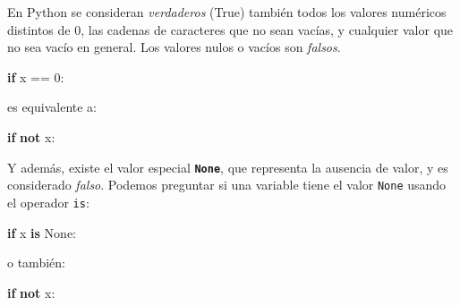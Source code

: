 \documentclass[
  letterpaper,
  DIV=11,
  numbers=noendperiod]{scrreprt}
\newenvironment{Shaded}{\begin{snugshade}}{\end{snugshade}}
\newcommand{\ControlFlowTok}[1]{\textcolor[rgb]{0.00,0.23,0.31}{\textbf{#1}}}
\newcommand{\DecValTok}[1]{\textcolor[rgb]{0.68,0.00,0.00}{#1}}
\newcommand{\KeywordTok}[1]{\textcolor[rgb]{0.00,0.23,0.31}{\textbf{#1}}}
\newcommand{\NormalTok}[1]{\textcolor[rgb]{0.00,0.23,0.31}{#1}}
\newcommand{\OperatorTok}[1]{\textcolor[rgb]{0.37,0.37,0.37}{#1}}
\newcommand{\VariableTok}[1]{\textcolor[rgb]{0.07,0.07,0.07}{#1}}
\begin{document}
\begin{tcolorbox}[enhanced jigsaw, arc=.35mm, toptitle=1mm, colframe=quarto-callout-tip-color-frame, bottomtitle=1mm, opacitybacktitle=0.6, colbacktitle=quarto-callout-tip-color!10!white, leftrule=.75mm, coltitle=black, toprule=.15mm, titlerule=0mm, title=\textcolor{quarto-callout-tip-color}{\faLightbulb}\hspace{0.5em}{Sabías que\ldots{} ?}, bottomrule=.15mm, rightrule=.15mm, colback=white, breakable, opacityback=0, left=2mm]

En Python se consideran \emph{verdaderos} (True) también todos los
valores numéricos distintos de 0, las cadenas de caracteres que no sean
vacías, y cualquier valor que no sea vacío en general. Los valores nulos
o vacíos son \emph{falsos}.

\begin{Shaded}
\begin{Highlighting}[]
\ControlFlowTok{if}\NormalTok{ x }\OperatorTok{==} \DecValTok{0}\NormalTok{:}
\end{Highlighting}
\end{Shaded}

es equivalente a:

\begin{Shaded}
\begin{Highlighting}[]
\ControlFlowTok{if} \KeywordTok{not}\NormalTok{ x:}
\end{Highlighting}
\end{Shaded}

Y además, existe el valor especial \textbf{\texttt{None}}, que
representa la ausencia de valor, y es considerado \emph{falso}. Podemos
preguntar si una variable tiene el valor \texttt{None} usando el
operador \texttt{is}:

\begin{Shaded}
\begin{Highlighting}[]
\ControlFlowTok{if}\NormalTok{ x }\KeywordTok{is} \VariableTok{None}\NormalTok{:}
\end{Highlighting}
\end{Shaded}

o también:

\begin{Shaded}
\begin{Highlighting}[]
\ControlFlowTok{if} \KeywordTok{not}\NormalTok{ x:}
\end{Highlighting}
\end{Shaded}

\end{tcolorbox}
\end{document}
